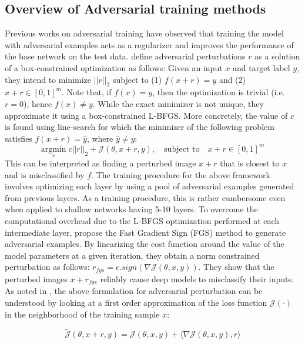 \subsection{Overview of Adversarial training methods}
Previous works on adversarial training have observed that training the model with adversarial examples acts as a regularizer and improves the performance of the base network on the test data. \citeauthor{szegedy2013intriguing}  define adversarial perturbations $r$ as a solution of a box-constrained optimization as follows: Given an input $x$ and target label $y$, they intend to minimize $||r||_{2}$ subject to (1) $f(x+r)=y$ and (2) $x+r \in [0,1]^{m}$. Note that, if $f(x)=y$, then the optimization is trivial (i.e. $r=0$), hence $f(x)\neq y$.  While the exact minimizer is not unique, they approximate it using a box-constrained L-BFGS. More concretely, the value of $c$ is found using line-search for which the minimizer of the following problem satisfies $f(x+r)=\hat{y}$, where $\hat{y}\neq y$:
\begin{equation}
\underset{r}{\text{argmin}} \;  c||r||_{2} + \mathcal{J}(\theta,x+r,y), \quad \text{subject to} \quad x + r \in [0,1]^{m}
\label{eq:lbfgs}
\end{equation}
This can be interpreted as finding a perturbed image $x+r$ that is closest to $x$ and is misclassified by $f$. The training procedure for the above framework involves optimizing each layer by using a pool of adversarial examples generated from previous layers. As a training procedure, this is rather cumbersome even when applied to shallow networks having 5-10 layers. To overcome the computational overhead due to the L-BFGS optimization performed at each intermediate layer, \cite{goodfellow2014explaining} propose the Fast Gradient Sign (FGS) method to generate adversarial examples. By linearizing the cost function around the value of the model parameters at a given iteration, they obtain a norm constrained perturbation as follows: $r_{fgs}=\epsilon . sign(\nabla\mathcal{J}(\theta,x,y))$. They show that the perturbed images $x+r_{fgs}$ reliably cause deep models to misclassify their inputs. As noted in \cite{understandingAT}, the above formulation for adversarial perturbation can be understood by looking at a first order approximation of the loss function $\mathcal{J}(\cdot)$ in the neighborhood of the training sample $x$:

\begin{equation}
\tilde{\mathcal{J}}(\theta,x+r,y) = \mathcal{J}(\theta,x,y)+ \langle \nabla\mathcal{J}(\theta,x,y),r\rangle
\end{equation}


